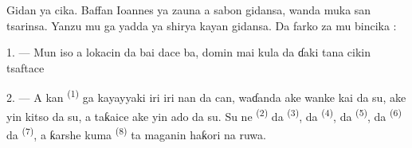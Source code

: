 %
%

\VUsaut{6.0mm}
\VUsaut{1.4mm}
\VUsaut{0.4mm}
\VUsaut{2.2mm}

Gidan ya cika. Baffan Ioannes ya zauna a sabon gidansa, wanda muka san
tsarinsa. Yanzu mu ga yadda ya shirya kayan gidansa. Da farko za mu
bincika :

\VUsaut{3.0mm}

1. --- Mun iso a lokacin da bai dace ba, domin mai kula da ɗaki tana
cikin tsaftace 

2. --- A kan  \textsuperscript{(1)} ga kayayyaki iri
iri nan da can, waɗanda ake wanke kai da su, ake yin kitso da su, a
taƙaice ake yin ado da su. Su ne 
\textsuperscript{(2)} da  \textsuperscript{(3)}, da
 \textsuperscript{(4)}, da 
\textsuperscript{(5)}, da  \textsuperscript{(6)} da
 \textsuperscript{(7)}, a ƙarshe kuma  \textsuperscript{(8)} ta maganin haƙori na ruwa.

